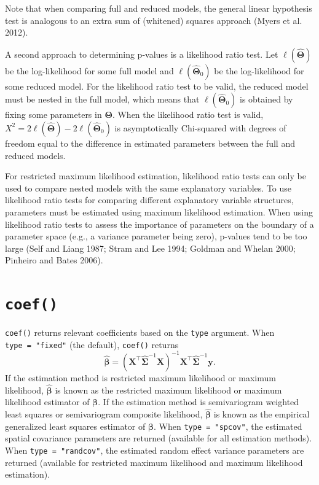 \documentclass{article}
\begin{document}
Note that when comparing full and reduced models, the general linear
hypothesis test is analogous to an extra sum of (whitened) squares
approach (Myers et al. 2012).

A second approach to determining p-values is a likelihood ratio test.
Let \(\ell(\boldsymbol{\hat{\Theta}})\) be the log-likelihood for some
full model and \(\ell(\boldsymbol{\hat{\Theta}}_0)\) be the
log-likelihood for some reduced model. For the likelihood ratio test to
be valid, the reduced model must be nested in the full model, which
means that \(\ell(\boldsymbol{\hat{\Theta}}_0)\) is obtained by fixing
some parameters in \(\boldsymbol{\Theta}\). When the likelihood ratio
test is valid,
\(X^2 = 2\ell(\boldsymbol{\hat{\Theta}}) - 2\ell(\boldsymbol{\hat{\Theta}}_0)\)
is asymptotically Chi-squared with degrees of freedom equal to the
difference in estimated parameters between the full and reduced models.

For restricted maximum likelihood estimation, likelihood ratio tests can
only be used to compare nested models with the same explanatory
variables. To use likelihood ratio tests for comparing different
explanatory variable structures, parameters must be estimated using
maximum likelihood estimation. When using likelihood ratio tests to
assess the importance of parameters on the boundary of a parameter space
(e.g., a variance parameter being zero), p-values tend to be too large
(Self and Liang 1987; Stram and Lee 1994; Goldman and Whelan 2000;
Pinheiro and Bates 2006).

\hypertarget{sec:coef}{%
\section{\texorpdfstring{\texttt{coef()}}{coef()}}\label{sec:coef}}

\texttt{coef()} returns relevant coefficients based on the \texttt{type}
argument. When \texttt{type\ =\ "fixed"} (the default), \texttt{coef()}
returns \begin{equation*}
\hat{\boldsymbol{\beta}} = (\mathbf{X}^\top \hat{\boldsymbol{\Sigma}}^{-1} \mathbf{X})^{-1}\mathbf{X}^\top \hat{\boldsymbol{\Sigma}}^{-1} \mathbf{y} .
\end{equation*} If the estimation method is restricted maximum
likelihood or maximum likelihood, \(\hat{\boldsymbol{\beta}}\) is known
as the restricted maximum likelihood or maximum likelihood estimator of
\(\boldsymbol{\beta}\). If the estimation method is semivariogram
weighted least squares or semivariogram composite likelihood,
\(\hat{\boldsymbol{\beta}}\) is known as the empirical generalized least
squares estimator of \(\boldsymbol{\beta}\). When
\texttt{type\ =\ "spcov"}, the estimated spatial covariance parameters
are returned (available for all estimation methods). When
\texttt{type\ =\ "randcov"}, the estimated random effect variance
parameters are returned (available for restricted maximum likelihood and
maximum likelihood estimation).
\end{document}

